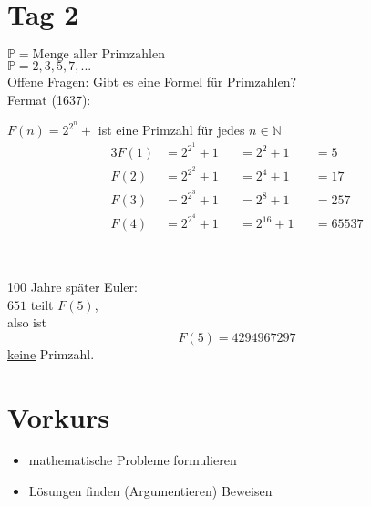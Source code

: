 \documentclass[a4paper]{article}
\begin{document}
\section{Tag 2}
$\mathbb{P} = \text{Menge aller Primzahlen}$\\
$\mathbb{P} = {2, 3, 5, 7, ...}$\\
Offene Fragen: Gibt es eine Formel für Primzahlen?\\
Fermat (1637):\par
\begin{minipage}{0.5\textwidth}
	\setlength{\parindent}{1em}
	\begin{conjecturebox}
		$F(n) = 2^{2^n} + $ ist eine Primzahl für jedes $n \in \mathbb{N}$
		\begin{alignat*}{3}
			F(1) &= 2^{2^1} + 1 &&= 2^2 + 1 &&= 5\\
			F(2) &= 2^{2^2} + 1 &&= 2^4 + 1 &&= 17\\
			F(3) &= 2^{2^3} + 1 &&= 2^8 + 1 &&= 257\\
			F(4) &= 2^{2^4} + 1 &&= 2^16 + 1 &&= 65537
		\end{alignat*}
	\end{conjecturebox}
\end{minipage}
\begin{minipage}{0.05\textwidth}
	~
\end{minipage}
\begin{minipage}{0.4\textwidth}
	\setlength{\parindent}{1em}
	100 Jahre später Euler:\\
	$651$ teilt $F(5)$,\\
	also ist
	\[F(5) = 4294967297\]
	\underline{keine} Primzahl.
\end{minipage}

\section{Vorkurs}
\begin{itemize}
	\item mathematische Probleme formulieren
	\item Lösungen finden (Argumentieren) Beweisen
\end{itemize}
\end{document}
